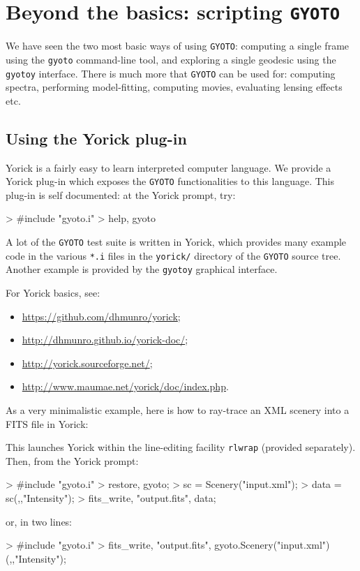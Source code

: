 \documentclass[a4paper,12pt]{article}
\begin{document}
\section{Beyond the basics: scripting \texttt{GYOTO}}

We have seen the two most basic ways of using \texttt{GYOTO}:
computing a single frame using the \texttt{gyoto} command-line tool,
and exploring a single geodesic using the \texttt{gyotoy}
interface. There is much more that \texttt{GYOTO} can be used for:
computing spectra, performing model-fitting, computing movies,
evaluating lensing effects etc.

\subsection{Using the Yorick plug-in}

Yorick is a fairly easy to learn interpreted computer language. We
provide a Yorick plug-in which exposes the \texttt{GYOTO}
functionalities to this language. This plug-in is self documented: at
the Yorick prompt, try:
\begin{code}
 > #include "gyoto.i"
 > help, gyoto
\end{code}

A lot of the \texttt{GYOTO} test suite is written in Yorick, which
provides many example code in the various \texttt{*.i} files in the
\texttt{yorick/} directory of the \texttt{GYOTO} source tree. Another
example is provided by the \texttt{gyotoy} graphical interface.

For Yorick basics, see:
\begin{itemize}
\item \url{https://github.com/dhmunro/yorick};
\item \url{http://dhmunro.github.io/yorick-doc/};
\item \url{http://yorick.sourceforge.net/};
\item \url{http://www.maumae.net/yorick/doc/index.php}.
\end{itemize}

As a very minimalistic example, here is how to ray-trace an XML
scenery into a FITS file in Yorick:
This launches Yorick within the line-editing facility \texttt{rlwrap}
(provided separately). Then, from the Yorick prompt:
\begin{code}
 > #include "gyoto.i"
 > restore, gyoto;
 > sc = Scenery("input.xml");
 > data = sc(,,"Intensity");
 > fits_write, "output.fits", data;
\end{code}
or, in two lines:
\begin{code}
 > #include "gyoto.i"
 > fits_write, "output.fits", gyoto.Scenery("input.xml")(,,"Intensity");
\end{code}
\end{document}
